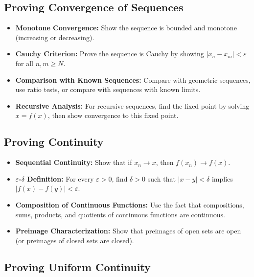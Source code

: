 \subsection*{Proving Convergence of Sequences}

\begin{itemize}
\item \textbf{Monotone Convergence:} Show the sequence is bounded and monotone (increasing or decreasing).

\item \textbf{Cauchy Criterion:} Prove the sequence is Cauchy by showing $|x_n - x_m| < \varepsilon$ for all $n, m \geq N$.

\item \textbf{Comparison with Known Sequences:} Compare with geometric sequences, use ratio tests, or compare with sequences with known limits.

\item \textbf{Recursive Analysis:} For recursive sequences, find the fixed point by solving $x = f(x)$, then show convergence to this fixed point.
\end{itemize}

\subsection*{Proving Continuity}

\begin{itemize}
\item \textbf{Sequential Continuity:} Show that if $x_n \to x$, then $f(x_n) \to f(x)$.

\item \textbf{$\varepsilon$-$\delta$ Definition:} For every $\varepsilon > 0$, find $\delta > 0$ such that $|x - y| < \delta$ implies $|f(x) - f(y)| < \varepsilon$.

\item \textbf{Composition of Continuous Functions:} Use the fact that compositions, sums, products, and quotients of continuous functions are continuous.

\item \textbf{Preimage Characterization:} Show that preimages of open sets are open (or preimages of closed sets are closed).
\end{itemize}

\subsection*{Proving Uniform Continuity}

